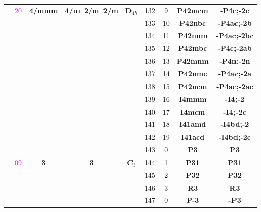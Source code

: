 \documentclass{article}      %
\begin{document}
\begin{small}
\begin{longtable}[c]{|c|c|c|c|c|c|c|c|c|}
& \textrm{\textcolor{magenta}{20}} &\textbf{4/mmm} &\textbf{4/m~2/m~2/m} &$\mathbf{D}_{4h}$ &\textrm{132} &\textrm{9} &\textbf{P42mcm} &\textbf{-P4c;-2c}\\\cline{6-9}       
          & & & & &\textrm{133} &\textrm{10} &\textbf{P42nbc}     &\textbf{-P4ac;-2b}\\\cline{6-9}      
          & & & & &\textrm{134} &\textrm{11} &\textbf{P42nnm}     &\textbf{-P4ac;-2bc}\\\cline{6-9}     
          & & & & &\textrm{135} &\textrm{12} &\textbf{P42mbc}     &\textbf{-P4c;-2ab}\\\cline{6-9}      
          & & & & &\textrm{136} &\textrm{13} &\textbf{P42mnm}     &\textbf{-P4n;-2n}\\\cline{6-9}       
          & & & & &\textrm{137} &\textrm{14} &\textbf{P42nmc}     &\textbf{-P4ac;-2a}\\\cline{6-9}      
          & & & & &\textrm{138} &\textrm{15} &\textbf{P42ncm}     &\textbf{-P4ac;-2ac}\\\cline{6-9}     
          & & & & &\textrm{139} &\textrm{16} &\textbf{I4mmm}     &\textbf{-I4;-2}\\\cline{6-9}          
          & & & & &\textrm{140} &\textrm{17} &\textbf{I4mcm}     &\textbf{-I4;-2c}\\\cline{6-9}         
          & & & & &\textrm{141} &\textrm{18} &\textbf{I41amd}     &\textbf{-I4bd;-2}\\\cline{6-9}       
          & & & & &\textrm{142} &\textrm{19} &\textbf{I41acd}     &\textbf{-I4bd;-2c}\\\hline
          & & & & &\textrm{143}  &\textrm{0} &\textbf{P3}         &\textbf{P3}\\\cline{6-9}             
	  &\textrm{\textcolor{magenta}{09}} &\textbf{3} &\textbf{3} &$\mathbf{C}_3$ &\textrm{144}  &\textrm{1} &\textbf{P31}   &\textbf{P31}\\\cline{6-9}      
	  & & & & &\textrm{145}  &\textrm{2} &\textbf{P32}         &\textbf{P32}\\\cline{6-9}           
          & & & & &\textrm{146}  &\textrm{3} &\textbf{R3}         &\textbf{R3}\\\cline{2-9}             
          & & & & &\textrm{147}  &\textrm{0} &\textbf{P-3}         &\textbf{-P3}\\\cline{6-9}           

\end{longtable}
\end{small}
\end{document}
